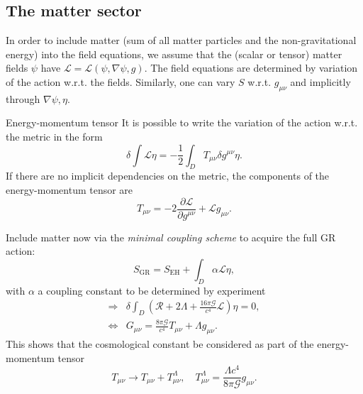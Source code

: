 \subsection{The matter sector}
In order to include matter (sum of all matter particles and the non-gravitational energy) into the field equations, we assume that the (scalar or tensor) matter fields $\psi$ have $\mathcal{L}=\mathcal{L}(\psi,\nabla \psi,g)$. The field equations are determined by variation of the action w.r.t. the fields. Similarly, one can vary $S$ w.r.t. $g_{\mu \nu}$ and implicitly through $\nabla \psi, \eta$. 
\begin{mybox}{Energy-momentum tensor}
	It is possible to write the variation of the action w.r.t. the metric in the form
	\begin{equation}
		\delta \int \mathcal{L} \eta = -\frac{1}{2} \int_D T_{\mu \nu} \delta g^{\mu \nu} \eta.
	\end{equation}
	If there are no implicit dependencies on the metric, the components of the energy-momentum tensor are
	\begin{equation}
		T_{\mu \nu} = -2 \frac{\partial \mathcal{L}}{\partial g^{\mu \nu}} + \mathcal{L} g_{\mu \nu}.
	\end{equation}
\end{mybox}
Include matter now via the \emph{minimal coupling scheme} to acquire the full GR action:
\begin{equation}
	S_{\mathrm{GR}} = S_{\mathrm{EH}} + \int_D \alpha \mathcal{L} \eta,
\end{equation}
with $\alpha$ a coupling constant to be determined by experiment
\begin{align}
	\Rightarrow &\delta \int_D \left(\mathcal{R} + 2 \Lambda+\frac{16  \pi \mathcal{G}}{c^4} \mathcal{L}\right) \eta = 0,\\
	\Leftrightarrow &G_{\mu \nu} = \frac{8 \pi \mathcal{G}}{c^4} T_{\mu \nu} + \Lambda g_{\mu \nu}.
\end{align}
This shows that the cosmological constant be considered as part of the energy-momentum tensor
\begin{equation}
	T_{\mu \nu} \rightarrow T_{\mu \nu} +T^{\Lambda}_{\mu \nu}, \quad T^{\Lambda}_{\mu \nu} = \frac{\Lambda c^4}{8 \pi \mathcal{G}} g_{\mu \nu}.
\end{equation}

